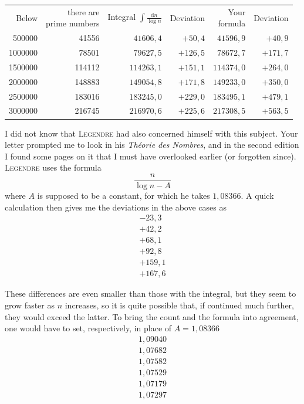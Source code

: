 \begin{center}
\begingroup\fontsize{10}{11.5}\selectfont\setlength{\tabcolsep}{3pt}
\begin{tabular}{r|r|rr|rr}
Below & \shortstack{there are\\prime numbers} & \shortstack{Integral\\$\displaystyle\int\frac{\mathrm{d}n}{\log n}$} & Deviation & \shortstack{Your\\formula} & Deviation \\
500000 & 41556 & $41606{,}4$ & $+50{,}4$ & $41596{,}9$ & $+40{,}9$ \\
1000000 & 78501 & $79627{,}5$ & $+126{,}5$ & $78672{,}7$ & $+171{,}7$ \\
1500000 & 114112 & $114263{,}1$ & $+151{,}1$ & $114374{,}0$ & $+264{,}0$ \\
2000000 & 148883 & $149054{,}8$ & $+171{,}8$ & $149233{,}0$ & $+350{,}0$ \\
2500000 & 183016 & $183245{,}0$ & $+229{,}0$ & $183495{,}1$ & $+479{,}1$ \\
3000000 & 216745 & $216970{,}6$ & $+225{,}6$ & $217308{,}5$ & $+563{,}5$
\end{tabular}\endgroup
\end{center}

I did not know that \textsc{Legendre} had also concerned himself with this subject. Your letter prompted me to look in his \textit{Théorie des Nombres}, and in the second edition I found some pages on it that I must have overlooked earlier (or forgotten since). \textsc{Legendre} uses the formula
\[
\frac{n}{\log n-A}
\]
where $A$ is supposed to be a constant, for which he takes $1{,}08366$. A quick calculation then gives me the deviations in the above cases as
\[
\begin{array}{r}
-23{,}3\\
+42{,}2\\
+68{,}1\\
+92{,}8\\
+159{,}1\\
+167{,}6
\end{array}
\]

These differences are even smaller than those with the integral, but they seem to grow faster as $n$ increases, so it is quite possible
%
that, if continued much further, they would exceed the latter. To bring the count and the formula into agreement, one would have to set, respectively, in place of \mbox{$A=1{,}08366$}
\[
\begin{array}{r}
1{,}09040\\
1{,}07682\\
1{,}07582\\
1{,}07529\\
1{,}07179\\
1{,}07297
\end{array}
\]

